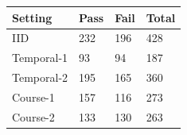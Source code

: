 \begin{tabular}{llll}
\toprule
Setting & Pass & Fail & Total\\
\midrule
IID & 232 & 196 & 428\\
Temporal-1 & 93 & 94 & 187\\
Temporal-2 & 195 & 165 & 360\\
Course-1 & 157 & 116 & 273\\
Course-2 & 133 & 130 & 263\\
\bottomrule
\end{tabular}